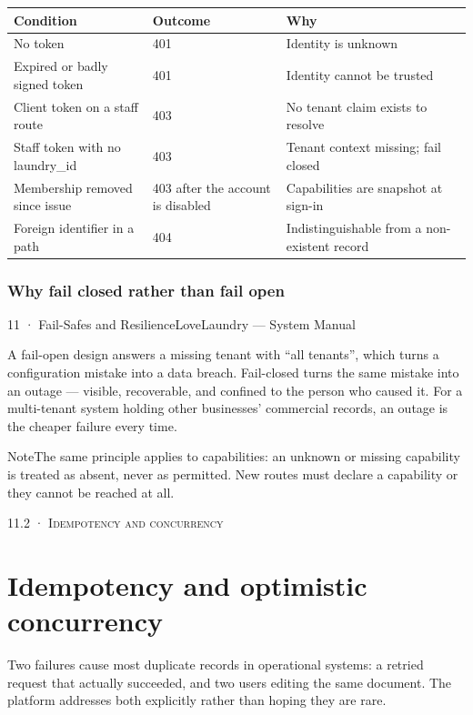 \documentclass[11pt,a4paper,oneside]{book}
\begin{document}
\begin{center}\small
\begin{tabularx}{\linewidth}{|X|X|X|}
\hline
\rowcolor{lightgrey}
\textbf{Condition} & \textbf{Outcome} & \textbf{Why} \\ \hline
No token & 401 & Identity is unknown \\ \hline
Expired or badly signed token & 401 & Identity cannot be trusted \\ \hline
Client token on a staff route & 403 & No tenant claim exists to resolve \\ \hline
Staff token with no laundry\_id & 403 & Tenant context missing; fail closed \\ \hline
Membership removed since issue & 403 after the account is disabled & Capabilities are snapshot at sign-in \\ \hline
Foreign identifier in a path & 404 & Indistinguishable from a non-existent record \\ \hline
\end{tabularx}
\end{center}
\subsubsection*{Why fail closed rather than fail open}
11 · Fail-Safes and ResilienceLoveLaundry — System Manual

A fail-open design answers a missing tenant with “all tenants”, which turns a configuration mistake into a data breach. Fail-closed turns the same mistake into an outage — visible, recoverable, and confined to the person who caused it. For a multi-tenant system holding other businesses' commercial records, an outage is the cheaper failure every time.

\begin{notebox}NoteThe same principle applies to capabilities: an unknown or missing capability is treated as absent, never as permitted. New routes must declare a capability or they cannot be reached at all.\end{notebox}
\textsc{\small\color{crimson}11.2 · Idempotency and concurrency}\par\medskip
\section*{Idempotency and optimistic concurrency}
Two failures cause most duplicate records in operational systems: a retried request that actually succeeded, and two users editing the same document. The platform addresses both explicitly rather than hoping they are rare.
\end{document}
